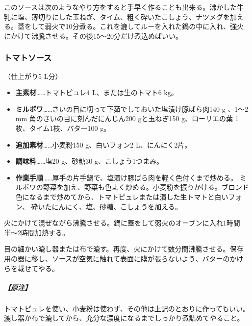 \begin{recette}
このソースは次のようなやり方をすると手早く作ることも出来る。沸かした牛
乳に塩、薄切りにした玉ねぎ、タイム、粗く砕いたこしょう、ナツメグを加え
る。蓋をして弱火で10分煮る。これを漉してルーを入れた鍋の中に入れ、強火
にかけて沸騰させる。その後15〜20分だけ煮込めばいい。

\maeaki

\hypertarget{sauce-tomate}{%
\subsubsection{トマトソース}\label{sauce-tomate}}



（仕上がり5 L分）

\begin{itemize}
\item
  \textbf{主素材}\ldots{}\ldots{}トマトピュレ4 L、または生のトマト6 kg。
\item
  \textbf{ミルポワ}\ldots{}\ldots{}さいの目に切って下茹でしておいた塩漬け豚ばら肉140
  g 、1〜2 mm 角のさいの目に刻んだにんじん200 gと玉ねぎ150
  g、ローリエの葉 1枚、タイム1枝、バター100 g。
\item
  \textbf{追加素材}\ldots{}\ldots{}小麦粉150 g、白いフォン2
  L、にんにく2片。
\item
  \textbf{調味料}\ldots{}\ldots{}塩20 g、砂糖30 g、こしょう1つまみ。
\item
  \textbf{作業手順}\ldots{}\ldots{}厚手の片手鍋で、塩漬け豚ばら肉を軽く色付くまで炒める。
  ミルポワの野菜を加え、野菜も色よく炒める。小麦粉を振りかける。ブロンド
  色になるまで炒めてから、トマトピュレまたは潰した生トマトと白いフォン、
  砕いたにんにく、塩、砂糖、こしょうを加える。
\end{itemize}

火にかけて混ぜながら沸騰させる。鍋に蓋をして弱火のオーブンに入れ1時間
半〜2時間加熱する。

目の細かい漉し器または布で漉す。再度、火にかけて数分間沸騰させる。保存
用の器に移し、ソースが空気に触れて表面に膜が張らないよう、バターのかけ
らを載せてやる。

\hypertarget{nota-sauce-tomate}{%
\subparagraph{【原注】}\label{nota-sauce-tomate}}

トマトピュレを使い、小麦粉は使わず、その他は上記のとおりに作ってもいい。
漉し器か布で漉してから、充分な濃度になるまでしっかり煮詰めてやること。
\end{recette}